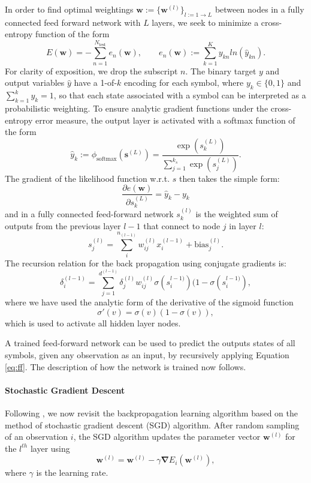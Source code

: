 \documentclass{article}
\newcommand{\be}{\begin{equation}}
\newcommand{\ee}{\end{equation}}
\begin{document}
In order to find optimal weightings $\mathbf{w}:=\{\mathbf{w}^{(l)}\}_{l:=1\rightarrow L}$  between nodes  in a fully connected feed forward network with $L$ layers, we seek to minimize a cross-entropy function of the form
\be
E(\mathbf{w}) = - \sum_{n=1}^{N_{\text{test}}} e_n(\mathbf{w}), \qquad e_n(\mathbf{w}):= \sum_{k=1}^K y_{kn}ln\left(\hat{y}_{kn}\right).
\ee
For clarity of exposition, we drop the subscript $n$. The binary target $y$ and output variables $\hat{y}$ have a 1-of-$k$ encoding for each symbol, where $y_k\in \{0,1\}$ and $\sum_{k=1}^{k} y_k=1$, so that each state associated with a symbol can be interpreted as a probabilistic weighting. To ensure analytic gradient functions under the cross-entropy error measure, the output layer is activated with a softmax function of the form
\be
 \hat{y}_k:= \phi_{\text{softmax}}(\mathbf{s}^{(L)})= \frac{\exp(s^{(L)}_k)}{\sum_{j=1}^{k_s}\exp(s^{(L)}_j)}.
\ee
The gradient of the likelihood function w.r.t. $s$ then takes the simple form:
\be
\frac{\partial e(\mathbf{w})}{\partial s^{(L)}_k} = \hat{y}_k - y_{k}
\ee
and in a fully connected feed-forward network $s^{(l)}_k$ is the weighted sum of outputs from the previous layer $l-1$ that connect to node $j$ in layer $l$:
\be \label{eq:ff}
s_j^{(l)} = \sum_i^{n_{(l-1)}} w_{ij}^{(l)}x_i^{(l-1)} + \text{bias}_j^{(l)}.
\ee
The recursion relation for the back propagation using conjugate gradients is:
\be
\delta_i^{(l-1)}= \sum_{j=1}^{d^{(l-1)}}\delta_j^{(l)}w_{ij}^{(l)} \sigma(s_i^{l-1)})(1- \sigma(s_i^{l-1)}),
\ee
where we have used the analytic form of the derivative of the sigmoid function 
\be
\sigma'(v) = \sigma(v) (1-\sigma(v)),
\ee
which is used to activate all hidden layer nodes. 

A trained feed-forward network can be used to predict the outputs states of all symbols, given any observation as an input, by recursively applying Equation \ref{eq:ff}. The description of how the network is trained now follows.

\paragraph{Stochastic Gradient Descent} Following \citet{Rojas1996}, we now revisit the backpropagation learning algorithm based on the method of stochastic gradient descent (SGD) algorithm. After random sampling of an observation $i$, the SGD algorithm updates the parameter vector $\mathbf{w}^{(l)}$ for the $l^{th}$ layer using
\be
\mathbf{w}^{(l)} = \mathbf{w}^{(l)} - \gamma \mathbf{\nabla} E_i(\mathbf{w}^{(l)}),
\ee
where $\gamma$ is the learning rate.
\end{document}
